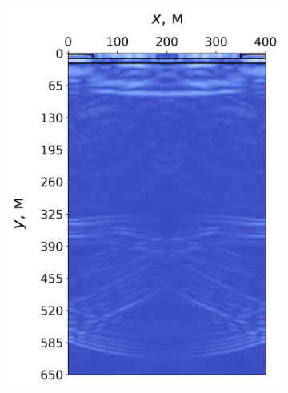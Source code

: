 \begin{figure}[H]
    \centering
    \begin{subfigure}{0.49\textwidth}
        \centering
        \includegraphics[width=\textwidth]{images/gas_field/012000.png}
    \end{subfigure}
    \hfill
    \begin{subfigure}{0.49\textwidth}
        \centering

\end{subfigure}
\end{figure}
